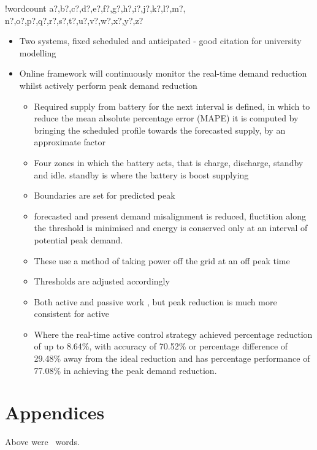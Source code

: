 \documentclass[10pt]{article}
\providecommand{\tightlist}{%
  \setlength{\itemsep}{0pt}\setlength{\parskip}{0pt}}
\newcounter{words}
\newenvironment{counted}{%
  \setcounter{words}{0}
  \SearchList!{wordcount}{\stepcounter{words}}
    {a?,b?,c?,d?,e?,f?,g?,h?,i?,j?,k?,l?,m?,
    n?,o?,p?,q?,r?,s?,t?,u?,v?,w?,x?,y?,z?}
  \UndoBoundary{'}
  \SearchOrder{p;}}{%
  \StopSearching}
\begin{document}
\begin{counted}
\begin{itemize}
\tightlist
\item
  Two systems, fixed scheduled and anticipated \cite{20164002874437} -
  good citation for university modelling
\item
  Online framework will continuously monitor the real-time demand
  reduction whilst actively perform peak demand reduction

  \begin{itemize}
  \tightlist
  \item
    Required supply from battery for the next interval is defined, in
    which to reduce the mean absolute percentage error (MAPE) it is
    computed by bringing the scheduled profile towards the forecasted
    supply, by an approximate factor
  \item
    Four zones in which the battery acts, that is charge, discharge,
    standby and idle. standby is where the battery is boost supplying
  \item
    Boundaries are set for predicted peak
  \item
    forecasted and present demand misalignment is reduced, fluctition
    along the threshold is minimised and energy is conserved only at an
    interval of potential peak demand.
  \item
    These use a method of taking power off the grid at an off peak time
  \item
    Thresholds are adjusted accordingly
  \item
    Both active and passive work , but peak reduction is much more
    consistent for active
  \item
    Where the real-time active control strategy achieved percentage
    reduction of up to 8.64\%, with accuracy of 70.52\% or percentage
    difference of 29.48\% away from the ideal reduction and has
    percentage performance of 77.08\% in achieving the peak demand
    reduction.
  \end{itemize}
\end{itemize}

\end{counted} %

\newpage
\section{Appendices}
Above were \thewords\ words. %
\newpage
\end{document}
